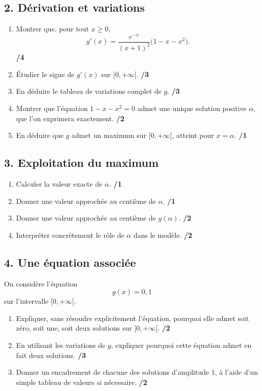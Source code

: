 \documentclass[11pt,a4paper]{article}
\begin{document}
\subsection*{2. Dérivation et variations}
\begin{enumerate}
    \item Montrer que, pour tout \(x\geq 0\),
    \[
    g'(x)=\frac{e^{-x}}{(x+1)^2}\bigl(1-x-x^2\bigr).
    \]
    \hfill \textbf{/4}
    \item Étudier le signe de \(g'(x)\) sur \([0,+\infty[\). \hfill \textbf{/3}
    \item En déduire le tableau de variations complet de \(g\). \hfill \textbf{/3}
    \item Montrer que l'équation \(1-x-x^2=0\) admet une unique solution positive \(\alpha\), que l'on exprimera exactement. \hfill \textbf{/2}
    \item En déduire que \(g\) admet un maximum sur \([0,+\infty[\), atteint pour \(x=\alpha\). \hfill \textbf{/1}
\end{enumerate}

\subsection*{3. Exploitation du maximum}
\begin{enumerate}
    \item Calculer la valeur exacte de \(\alpha\). \hfill \textbf{/1}
    \item Donner une valeur approchée au centième de \(\alpha\). \hfill \textbf{/1}
    \item Donner une valeur approchée au centième de \(g(\alpha)\). \hfill \textbf{/2}
    \item Interpréter concrètement le rôle de \(\alpha\) dans le modèle. \hfill \textbf{/2}
\end{enumerate}

\subsection*{4. Une équation associée}
On considère l'équation
\[
g(x)=0,1
\]
sur l'intervalle \([0,+\infty[\).

\begin{enumerate}
    \item Expliquer, sans résoudre explicitement l'équation, pourquoi elle admet soit zéro, soit une, soit deux solutions sur \([0,+\infty[\). \hfill \textbf{/2}
    \item En utilisant les variations de \(g\), expliquer pourquoi cette équation admet en fait deux solutions. \hfill \textbf{/3}
    \item Donner un encadrement de chacune des solutions d'amplitude \(1\), à l'aide d'un simple tableau de valeurs si nécessaire. \hfill \textbf{/2}
\end{enumerate}
\end{document}

